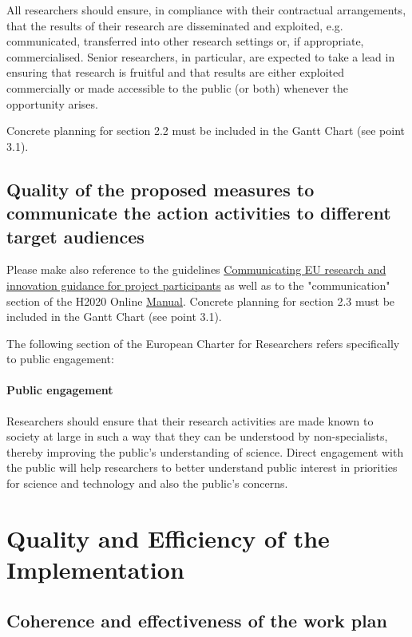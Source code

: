 \documentclass[a4paper,11pt]{article}
\begin{document}
All researchers should ensure, in compliance with their contractual arrangements, that the results of their research are disseminated and exploited, e.g. communicated, transferred into other research settings or, if appropriate, commercialised. Senior researchers, in particular, are expected to take a lead in ensuring that research is fruitful and that results are either exploited commercially or made accessible to the public (or both) whenever the opportunity arises.

Concrete planning for section 2.2 must be included in the Gantt Chart (see point 3.1).

\subsection{Quality of the proposed measures to communicate the action activities to different target audiences}

Please make also reference to the guidelines \href{http://ec.europa.eu/research/participants/data/ref/h2020/other/gm/h2020-guide-comm_en.pdf}{Communicating EU research and innovation guidance for project participants} as well as to the "communication" section of the H2020 Online \href{http://ec.europa.eu/research/participants/docs/h2020-funding-guide/grants/grant-management/communication_en.htm}{Manual}.
Concrete planning for section 2.3 must be included in the Gantt Chart (see point 3.1). 

The following section of the European Charter for Researchers refers specifically to public engagement:

\paragraph{Public engagement}

Researchers should ensure that their research activities are made known to society at large in such a way that they can be understood by non-specialists, thereby improving the public's understanding of science. Direct engagement with the public will help researchers to better understand public interest in priorities for science and technology and also the public's concerns. 

\section{Quality and Efficiency of the Implementation}
\label{sec:implementation}

\subsection{Coherence and effectiveness of the work plan}
\end{document}
